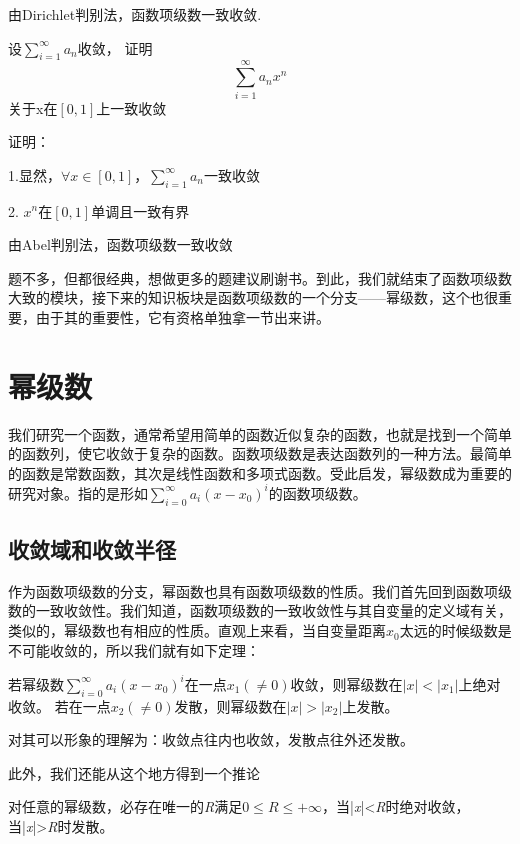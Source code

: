 \documentclass[lang=cn,10pt]{elegantbook}
\begin{document}
由Dirichlet判别法，函数项级数一致收敛.

\begin{example}
	设$\sum_{i=1}^{\infty }a_{n}$收敛，
	证明
	\begin{equation*}
		\sum_{i=1}^{\infty }a_{n}x^{n}  
	\end{equation*}
	关于x在$[0,1]$上一致收敛
\end{example}
证明：

1.显然，$\forall x \in[0,1] $，$\sum_{i=1}^{\infty }a_{n}$一致收敛

2. $x^{n}$在$[0,1]$单调且一致有界

由Abel判别法，函数项级数一致收敛

题不多，但都很经典，想做更多的题建议刷谢书。到此，我们就结束了函数项级数大致的模块，接下来的知识板块是函数项级数的一个分支——幂级数，这个也很重要，由于其的重要性，它有资格单独拿一节出来讲。
\section{幂级数}

我们研究一个函数，通常希望用简单的函数近似复杂的函数，也就是找到一个简单的函数列，使它收敛于复杂的函数。函数项级数是表达函数列的一种方法。最简单的函数是常数函数，其次是线性函数和多项式函数。受此启发，幂级数成为重要的研究对象。指的是形如$\sum_{i=0}^{\infty } a_{i} (x-x_{0} )^{i} $的函数项级数。
\subsection{收敛域和收敛半径}

作为函数项级数的分支，幂函数也具有函数项级数的性质。我们首先回到函数项级数的一致收敛性。我们知道，函数项级数的一致收敛性与其自变量的定义域有关，类似的，幂级数也有相应的性质。直观上来看，当自变量距离$x_{0}$太远的时候级数是不可能收敛的，所以我们就有如下定理：
\begin{theorem}[Abel第一定理]
	若幂级数$\sum_{i=0}^{\infty } a_{i} (x-x_{0} )^{i} $在一点$x_{1}(\ne 0)$收敛，则幂级数在$|x|<|x_{1}|$上绝对收敛。
	若在一点$x_{2}(\ne 0)$发散，则幂级数在$|x|>|x_{2}|$上发散。
\end{theorem}
对其可以形象的理解为：收敛点往内也收敛，发散点往外还发散。

此外，我们还能从这个地方得到一个推论

\begin{corollary}
	对任意的幂级数，必存在唯一的\textit{R}满足$0\le R \le +\infty$，当|\textit{x}|<\textit{R}时绝对收敛，当|\textit{x}|>\textit{R}时发散。
\end{corollary}
\end{document}
